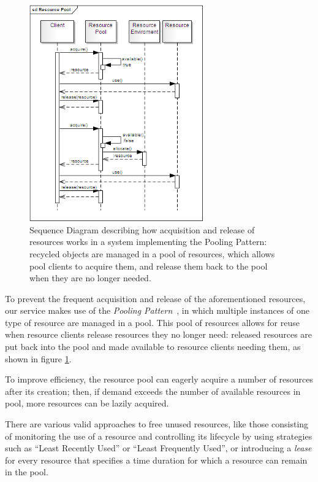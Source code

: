 \documentclass[11pt]{article}
\begin{document}
\begin{figure}[!ht]
\begin{center}
\includegraphics[width=7.5cm]{resource_pool}
\end{center}
\caption{Sequence Diagram describing how acquisition and release of resources works in a system implementing the Pooling Pattern: recycled objects are
managed in a pool of resources, which allows pool clients to acquire them, and release them back to the pool when they are no longer needed.}
\label{fig:rp}
\end{figure}

To prevent the frequent acquisition and release of the aforementioned resources, our service makes use of the \emph{Pooling Pattern}~\citep{kircher2001}, 
in which multiple instances of one type of resource are managed in a pool.  This pool of resources allows for reuse when resource clients release resources
they no longer need: released resources are put back into the pool and made available to resource clients needing them, as shown in figure \ref{fig:rp}.

To improve efficiency, the resource pool can eagerly acquire a number of resources after its creation; then, if demand exceeds the number of available resources in
pool, more resources can be lazily acquired.

There are various valid approaches to free unused resources, like those consisting of monitoring the use of a resource and controlling its lifecycle by using 
strategies such as ``Least Recently Used'' or ``Least Frequently Used'', or introducing a \emph{lease} for every resource that specifies a time duration for which
a resource can remain in the pool.\\
\end{document}
